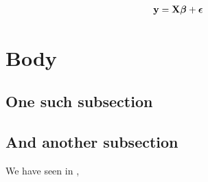 \documentclass[english, 11pt]{article}\usepackage[]{graphicx}\usepackage[]{color}
\begin{document}
\begin{align*}
{\mathbf y} = {\mathbf X}{\bm\beta} + {\bm\epsilon}	
\end{align*}

%
%
%

















\section{Body}

\lipsum[4]

\subsection{One such subsection}

\lipsum[5-8]

\subsection{And another subsection}

We have seen in \cite{bergsma2017}, \lipsum[9]

%
%
\end{document}
